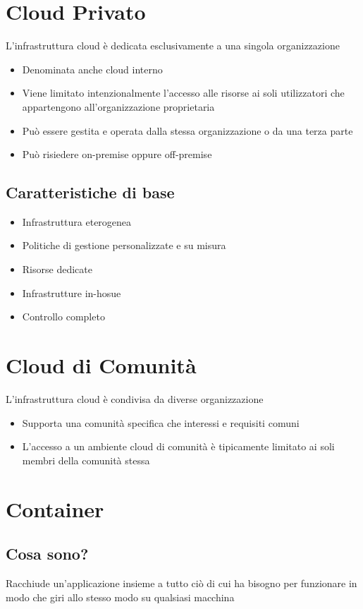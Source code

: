 \section{Cloud Privato}
L'infrastruttura cloud è dedicata esclusivamente a una singola organizzazione
\begin{itemize}
    \item Denominata anche cloud interno
    \item Viene limitato intenzionalmente l'accesso alle risorse ai soli utilizzatori che appartengono all'organizzazione proprietaria
    \item Può essere gestita e operata dalla stessa organizzazione o da una terza parte
    \item Può risiedere on-premise oppure off-premise
\end{itemize}

\subsection{Caratteristiche di base}
\begin{itemize}
    \item Infrastruttura eterogenea
    \item Politiche di gestione personalizzate e su misura
    \item Risorse dedicate
    \item Infrastrutture in-hosue
    \item Controllo completo
\end{itemize}

\section{Cloud di Comunità}
L'infrastruttura cloud è condivisa da diverse organizzazione
\begin{itemize}
    \item Supporta una comunità specifica che interessi e requisiti comuni
    \item L'accesso a un ambiente cloud di comunità è tipicamente limitato ai soli membri della comunità stessa
\end{itemize}

\section{Container}
\subsection{Cosa sono?}
Racchiude un'applicazione insieme a tutto ciò di cui ha bisogno per funzionare in modo che giri allo stesso modo su qualsiasi macchina

